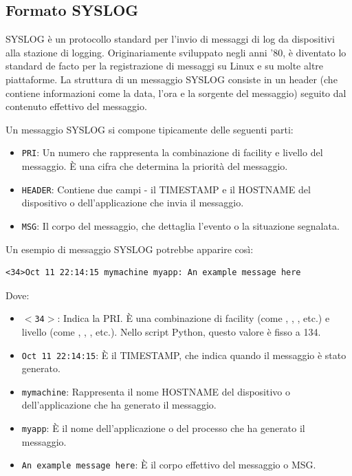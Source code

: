 \subsection{Formato SYSLOG} SYSLOG \cite{gerhards_syslog_protocol} è un protocollo standard per l'invio di messaggi di log da dispositivi alla stazione di logging. Originariamente sviluppato negli anni '80, è diventato lo standard de facto per la registrazione di messaggi su Linux e su molte altre piattaforme. La struttura di un messaggio SYSLOG consiste in un header (che contiene informazioni come la data, l'ora e la sorgente del messaggio) seguito dal contenuto effettivo del messaggio.

Un messaggio SYSLOG si compone tipicamente delle seguenti parti:

\begin{itemize}
  \item \texttt{PRI}: Un numero che rappresenta la combinazione di facility e livello del messaggio. È una cifra che determina la priorità del messaggio.
  \item \texttt{HEADER}: Contiene due campi - il TIMESTAMP e il HOSTNAME del dispositivo o dell'applicazione che invia il messaggio.
  \item \texttt{MSG}: Il corpo del messaggio, che dettaglia l'evento o la situazione segnalata.
\end{itemize}

Un esempio di messaggio SYSLOG potrebbe apparire così:

\begin{lstlisting}
<34>Oct 11 22:14:15 mymachine myapp: An example message here
\end{lstlisting}

Dove:

\begin{itemize}
  \item \texttt{$<$34$>$}: Indica la PRI. È una combinazione di facility (come , , , etc.) e livello (come , , , etc.). Nello script Python, questo valore è fisso a 134.
  \item \texttt{Oct 11 22:14:15}: È il TIMESTAMP, che indica quando il messaggio è stato generato.
  \item \texttt{mymachine}: Rappresenta il nome HOSTNAME del dispositivo o dell'applicazione che ha generato il messaggio.
  \item \texttt{myapp}: È il nome dell'applicazione o del processo che ha generato il messaggio.
  \item \texttt{An example message here}: È il corpo effettivo del messaggio o MSG.
\end{itemize}
